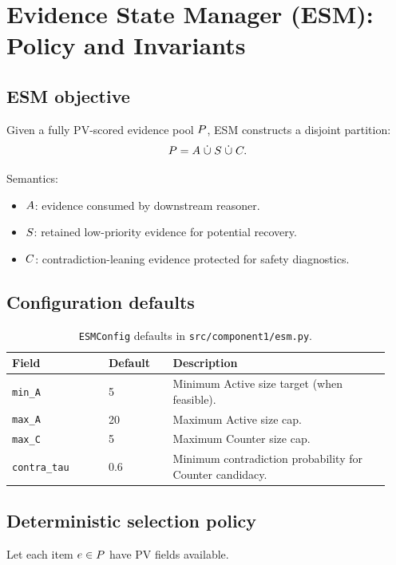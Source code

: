\section{Evidence State Manager (ESM): Policy and Invariants}
\label{sec:c1_esm}

\subsection{ESM objective}
Given a fully PV-scored evidence pool $P$, ESM constructs a disjoint partition:
\begin{equation}
P = A\;\dot\cup\;S\;\dot\cup\;C.
\end{equation}

Semantics:
\begin{itemize}
\item $A$: evidence consumed by downstream reasoner.
\item $S$: retained low-priority evidence for potential recovery.
\item $C$: contradiction-leaning evidence protected for safety diagnostics.
\end{itemize}

\subsection{Configuration defaults}
\begin{table}[H]
\centering
\begin{tabular}{@{}p{0.24\linewidth}p{0.16\linewidth}p{0.54\linewidth}@{}}
\toprule
Field & Default & Description \\
\midrule
\texttt{min\_A} & 5 & Minimum Active size target (when feasible). \\
\texttt{max\_A} & 20 & Maximum Active size cap. \\
\texttt{max\_C} & 5 & Maximum Counter size cap. \\
\texttt{contra\_tau} & 0.6 & Minimum contradiction probability for Counter candidacy. \\
\bottomrule
\end{tabular}
\caption{\texttt{ESMConfig} defaults in \texttt{src/component1/esm.py}.}
\label{tab:c1_esm_defaults}
\end{table}

\subsection{Deterministic selection policy}
Let each item $e\in P$ have PV fields available.

